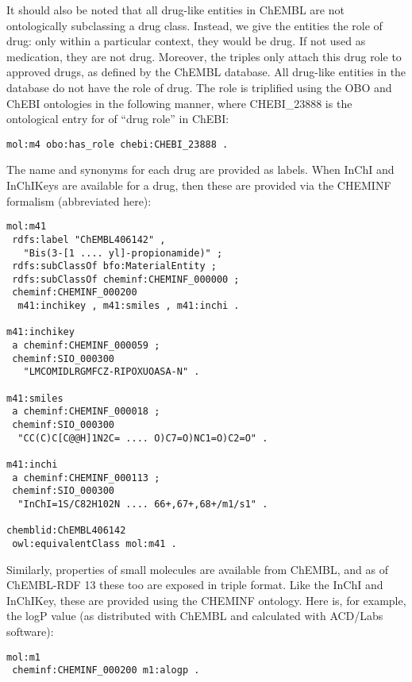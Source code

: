 \documentclass[10pt]{bmc_article}
\newenvironment{bmcformat}{\begin{raggedright}\baselineskip20pt\sloppy\setboolean{publ}{false}}{\end{raggedright}\baselineskip20pt\sloppy}
\begin{document}
\begin{bmcformat}
It should also be noted that all drug-like entities in ChEMBL are not ontologically
subclassing a drug class. Instead, we give the entities the role of drug: only within a
particular context, they would be drug. If not used as medication, they are not drug.
Moreover, the triples only attach this drug role to approved drugs, as defined by the
ChEMBL database. All drug-like entities in the database do not have the role of drug.
The role is triplified using the OBO and ChEBI ontologies in the following manner,
where CHEBI\_23888 is the ontological entry for of ``drug role'' in ChEBI:

\begin{small}
\begin{verbatim}
mol:m4 obo:has_role chebi:CHEBI_23888 .
\end{verbatim}
\end{small}

The name and synonyms for each drug are
provided as labels. When InChI and InChIKeys are available for a drug, then these are
provided via the CHEMINF formalism (abbreviated here):

\begin{small}
\begin{verbatim}
mol:m41
 rdfs:label "ChEMBL406142" , 
   "Bis(3-[1 .... yl]-propionamide)" ;
 rdfs:subClassOf bfo:MaterialEntity ;
 rdfs:subClassOf cheminf:CHEMINF_000000 ;
 cheminf:CHEMINF_000200
  m41:inchikey , m41:smiles , m41:inchi .

m41:inchikey
 a cheminf:CHEMINF_000059 ;
 cheminf:SIO_000300
   "LMCOMIDLRGMFCZ-RIPOXUOASA-N" .

m41:smiles
 a cheminf:CHEMINF_000018 ;
 cheminf:SIO_000300
  "CC(C)C[C@@H]1N2C= .... O)C7=O)NC1=O)C2=O" .

m41:inchi
 a cheminf:CHEMINF_000113 ;
 cheminf:SIO_000300
  "InChI=1S/C82H102N .... 66+,67+,68+/m1/s1" .

chemblid:ChEMBL406142
 owl:equivalentClass mol:m41 .
\end{verbatim}
\end{small}

Similarly, properties of small molecules are available from ChEMBL, and as of ChEMBL-RDF 13
these too are exposed in triple format. Like the InChI and InChIKey, these are provided using the
CHEMINF ontology. Here is, for example, the logP value (as distributed with ChEMBL and
calculated with ACD/Labs software):

\begin{small}
\begin{verbatim}
mol:m1
 cheminf:CHEMINF_000200 m1:alogp .


\end{verbatim}
\end{small}
\end{bmcformat}
\end{document}
